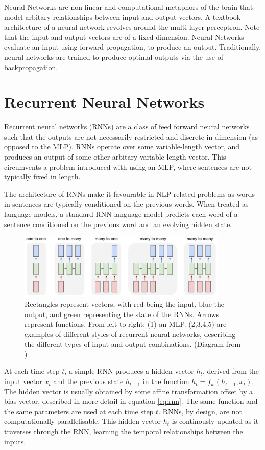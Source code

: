 \documentclass[12pt,twoside]{report}
\begin{document}
Neural Networks are non-linear and computational metaphors of the brain that model arbitary relationships between input and output vectors. A textbook architecture of a neural network revolves around the multi-layer perceptron. Note that the input and output vectors are of a fixed dimension. Neural Networks evaluate an input using forward propagation, to produce an output. Traditionally, neural networks are trained to produce optimal outputs via the use of backpropagation. 

\section{Recurrent Neural Networks}
\label{rnn}

Recurrent neural networks (RNNs) are a class of feed forward neural networks such that the outputs are not necessarily restricted and discrete in dimension (as opposed to the MLP). RNNs operate over some  variable-length vector, and produces an output of some other arbitary  variable-length vector. This circumvents a problem introduced with using an MLP, where sentences are not typically fixed in length. 

The architecture of RNNs make it favourable in NLP related problems as words in sentences are typically conditioned on the previous words. When treated as language models, a standard RNN language model predicts each word of a sentence conditioned on the previous word and an evolving hidden state.

\begin{figure}[!ht]
	\centering
	\includegraphics[width=100mm]{diagrams/rnn.jpeg}
	\caption{Rectangles represent vectors, with red being the input, blue the output, and green representing the state of the RNNs. Arrows represent  functions. From left to right: (1) an MLP. (2,3,4,5) are examples of different styles of recurrent neural networks, describing the different types of input and output combinations. (Diagram from \cite{karpathy_unreasonable_2015}) \label{rnn}} 
\end{figure}

At each time step $t$, a simple RNN produces a hidden vector $h_t$, derived from the input vector $x_t$ and the previous state $h_{t-1}$ in the function $h_t = f_w(h_{t-1}, x_t)$. The hidden vector is usually obtained by some affine transformation offset by a bias vector, described in more detail in equation \ref{eq:rnn}. The same function and the same parameters are used at each time step $t$. RNNs, by design, are not computationally parallelisable. This hidden vector $h_t$ is continously updated as it traverses through the RNN, learning the temporal relationships between the inputs.
\end{document}
